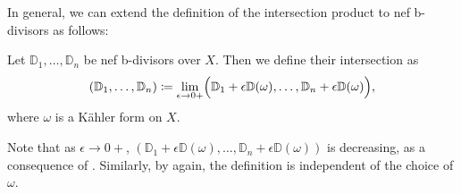 In general, we can extend the definition of the intersection product to nef b-divisors as follows:
\begin{definition}\label{def:DF_ext}
    Let $\mathbb{D}_1,\ldots,\mathbb{D}_n$ be nef b-divisors over $X$. Then we define their intersection as
    \begin{equation}\label{eq:mixed_product_limit_def}
        \left( \mathbb{D}_1,\ldots,\mathbb{D}_n \right)\coloneqq \lim_{\epsilon \to 0+}\Bigl( \mathbb{D}_1+\epsilon \mathbb{D}(\omega),\ldots,\mathbb{D}_n+\epsilon \mathbb{D}(\omega) \Bigr),
    \end{equation}
    where $\omega$ is a Kähler form on $X$.

    Note that as $\epsilon\to 0+$, $\left( \mathbb{D}_1+\epsilon \mathbb{D}(\omega),\ldots,\mathbb{D}_n+\epsilon \mathbb{D}(\omega) \right)$ is decreasing, as a consequence of . Similarly, by  again, the definition is independent of the choice of $\omega$.
\end{definition}


